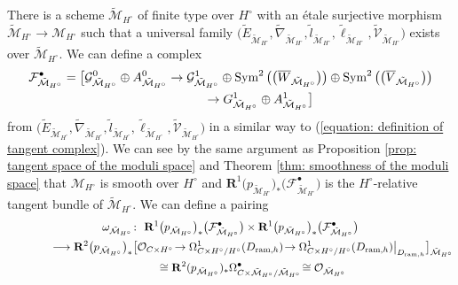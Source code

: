 \documentclass[pdftex]{sigma}
\numberwithin{equation}{section}
\newcommand{\Sym}{\mathop{\rm Sym}\nolimits}
\begin{document}
There is a scheme $\tilde{\mathcal M}_{H^{\circ}}$
of finite type over $H^{\circ}$
with an \'etale surjective morphism
$\tilde{\mathcal M}_{H^{\circ}}\longrightarrow {\mathcal M}_{H^{\circ}}$
such that a universal family
$\big(\tilde{E}_{\tilde{\mathcal M}_{H^{\circ}}},\tilde{\nabla}_{\tilde{\mathcal M}_{H^{\circ}}},
\tilde{l}_{\tilde{\mathcal M}_{H^{\circ}}},\tilde{\ell}_{\tilde{\mathcal M}_{H^{\circ}}},
\tilde{\mathcal V}_{\tilde{\mathcal M}_{H^{\circ}}}\big)$
exists over $\tilde{\mathcal M}_{H^{\circ}}$.
We can define a complex
\begin{gather*}
 {\mathcal F}_{\tilde{\mathcal M}_{H^{\circ}}}^{\bullet}
 =
\big[
 {\mathcal G}^0_{\tilde{\mathcal M}_{H^{\circ}}}\oplus A^0_{\tilde{\mathcal M}_{H^{\circ}}}
 \rightarrow
 {\mathcal G}^1_{\tilde{\mathcal M}_{H^{\circ}}}\oplus
 \Sym^2\big(\big(\overline{W}_{\tilde{\mathcal M}_{H^{\circ}}}\big)\big)
 \oplus \Sym^2\big(\big(\overline{V}_{\tilde{\mathcal M}_{H^{\circ}}}\big)\big)\\
 \hphantom{{\mathcal F}_{\tilde{\mathcal M}_{H^{\circ}}}^{\bullet} =\big[}{}
 \rightarrow G^1_{\tilde{\mathcal M}_{H^{\circ}}} \oplus A^1_{\tilde{\mathcal M}_{H^{\circ}}}
\big]
\end{gather*}
from
$\big(\tilde{E}_{\tilde{\mathcal M}_{H^{\circ}}},\tilde{\nabla}_{\tilde{\mathcal M}_{H^{\circ}}},
\tilde{l}_{\tilde{\mathcal M}_{H^{\circ}}},\tilde{\ell}_{\tilde{\mathcal M}_{H^{\circ}}},
\tilde{\mathcal V}_{\tilde{\mathcal M}_{H^{\circ}}}\big)$
in a similar way to (\ref{equation: definition of tangent complex}).
We can see by the same argument as
Proposition \ref{prop: tangent space of the moduli space}
and
Theorem \ref{thm: smoothness of the moduli space}
that ${\mathcal M}_{H^{\circ}}$ is smooth over $H^{\circ}$
and
$\mathbf{R}^1 \big(p_{\tilde{\mathcal M }_{H^{\circ}}}\big)_*
\big({\mathcal F}^{\bullet}_{\tilde{\mathcal M}_{H^{\circ}}}\big)$
is the $H^{\circ}$-relative tangent bundle of $\tilde{\mathcal M}_{H^{\circ}}$.
We can define a pairing
\begin{gather}
 \omega_{\tilde{\mathcal M}_{H^{\circ}}}\colon \
 \mathbf{R}^1 \big(p_{\tilde{\mathcal M}_{H^{\circ}}}\big)_*
 \big({\mathcal F}^{\bullet}_{\tilde{\mathcal M}_{H^{\circ}}}\big)
 \times \mathbf{R}^1 \big(p_{\tilde{\mathcal M}_{H^{\circ}}}\big)_ *
 \big({\mathcal F}^{\bullet}_{\tilde{\mathcal M}_{H^{\circ}}}\big)
 \nonumber\\
\hphantom{\omega_{\tilde{\mathcal M}_{H^{\circ}}}\colon}{} \ \longrightarrow
 \mathbf{R}^2 \big(p_{\tilde{\mathcal M}_{H^{\circ}}}\big)_ *
 \big[ {\mathcal O}_{C\times H^{\circ}}\!
 \to
 \Omega^1_{C\times H^{\circ}/H^{\circ}} (D_{\mathrm{ram},h})\!
 \to \Omega^1_{C\times H^{\circ}/H^{\circ}} (D_{\mathrm{ram},h})
 \big| _{ D_{\mathrm{ram},h} } \big]_{\tilde{\mathcal M}_{H^{\circ}}}\nonumber
 \\
\hphantom{\omega_{\tilde{\mathcal M}_{H^{\circ}}}\colon}{} \ \cong
 \mathbf{R}^2 (p_{\tilde{\mathcal M}_{H^{\circ}}})_ *
 \Omega^{\bullet}_{C\times \tilde{\mathcal M}_{H^{\circ}}/\tilde{\mathcal M}_{H^{\circ}}}\!
 \cong {\mathcal O}_{\tilde{\mathcal M}_{H^{\circ}}}\label{equation: definition of unfolded relative 2-form}
\end{gather}
\end{document}
